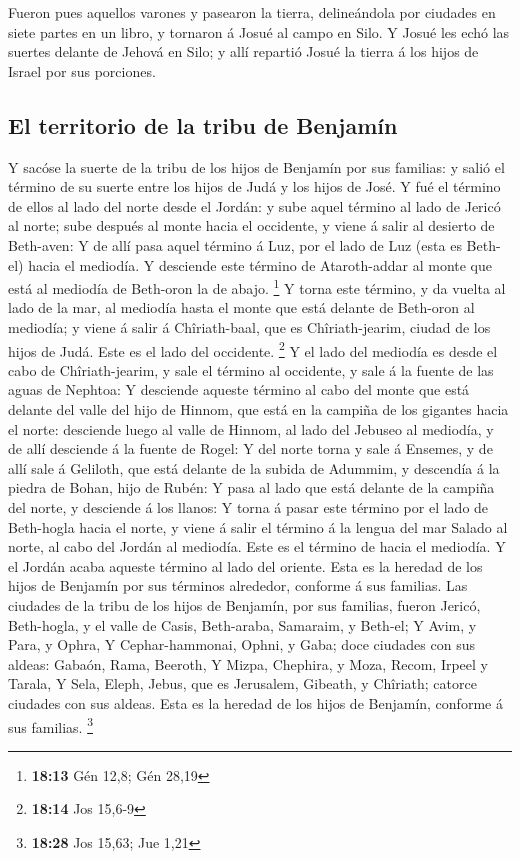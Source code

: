  Fueron pues aquellos varones y pasearon la tierra,
delineándola por ciudades en siete partes en un libro, y tornaron á
Josué al campo en Silo.  Y Josué les echó las suertes
delante de Jehová en Silo; y allí repartió Josué la tierra á los hijos
de Israel por sus porciones.

\hypertarget{el-territorio-de-la-tribu-de-benjamuxedn}{%
\subsection{El territorio de la tribu de
Benjamín}\label{el-territorio-de-la-tribu-de-benjamuxedn}}

 Y sacóse la suerte de la tribu de los hijos de Benjamín
por sus familias: y salió el término de su suerte entre los hijos de
Judá y los hijos de José.  Y fué el término de ellos al
lado del norte desde el Jordán: y sube aquel término al lado de Jericó
al norte; sube después al monte hacia el occidente, y viene á salir al
desierto de Beth-aven:  Y de allí pasa aquel término á Luz,
por el lado de Luz (esta es Beth-el) hacia el mediodía. Y desciende este
término de Ataroth-addar al monte que está al mediodía de Beth-oron la
de abajo. \footnote{\textbf{18:13} Gén 12,8; Gén 28,19}  Y
torna este término, y da vuelta al lado de la mar, al mediodía hasta el
monte que está delante de Beth-oron al mediodía; y viene á salir á
Chîriath-baal, que es Chîriath-jearim, ciudad de los hijos de Judá. Este
es el lado del occidente. \footnote{\textbf{18:14} Jos 15,6-9}
 Y el lado del mediodía es desde el cabo de
Chîriath-jearim, y sale el término al occidente, y sale á la fuente de
las aguas de Nephtoa:  Y desciende aqueste término al cabo
del monte que está delante del valle del hijo de Hinnom, que está en la
campiña de los gigantes hacia el norte: desciende luego al valle de
Hinnom, al lado del Jebuseo al mediodía, y de allí desciende á la fuente
de Rogel:  Y del norte torna y sale á Ensemes, y de allí
sale á Geliloth, que está delante de la subida de Adummim, y descendía á
la piedra de Bohan, hijo de Rubén:  Y pasa al lado que está
delante de la campiña del norte, y desciende á los llanos: 
Y torna á pasar este término por el lado de Beth-hogla hacia el norte, y
viene á salir el término á la lengua del mar Salado al norte, al cabo
del Jordán al mediodía. Este es el término de hacia el mediodía.
 Y el Jordán acaba aqueste término al lado del oriente.
Esta es la heredad de los hijos de Benjamín por sus términos alrededor,
conforme á sus familias.  Las ciudades de la tribu de los
hijos de Benjamín, por sus familias, fueron Jericó, Beth-hogla, y el
valle de Casis,  Beth-araba, Samaraim, y Beth-el;
 Y Avim, y Para, y Ophra,  Y Cephar-hammonai,
Ophni, y Gaba; doce ciudades con sus aldeas:  Gabaón, Rama,
Beeroth,  Y Mizpa, Chephira, y Moza,  Recom,
Irpeel y Tarala,  Y Sela, Eleph, Jebus, que es Jerusalem,
Gibeath, y Chîriath; catorce ciudades con sus aldeas. Esta es la heredad
de los hijos de Benjamín, conforme á sus familias. \footnote{\textbf{18:28}
  Jos 15,63; Jue 1,21}

